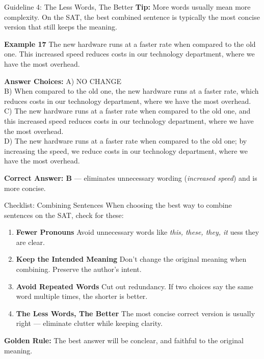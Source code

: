 \documentclass[aspectratio=169,11pt]{beamer}
\begin{document}
\begin{frame}{Guideline 4: The Less Words, The Better}
\small
\textbf{Tip:} More words usually mean more complexity. On the SAT, the best combined sentence is typically the most concise version that still keeps the meaning.

\vspace{0.5em}
\textbf{Example 17}  
The new hardware runs at a faster rate when compared to the old one. This increased speed reduces costs in our technology department, where we have the most overhead.  

\textbf{Answer Choices:}  
A) NO CHANGE \\
B) When compared to the old one, the new hardware runs at a faster rate, which reduces costs in our technology department, where we have the most overhead. \\
C) The new hardware runs at a faster rate when compared to the old one, and this increased speed reduces costs in our technology department, where we have the most overhead. \\
D) The new hardware runs at a faster rate when compared to the old one; by increasing the speed, we reduce costs in our technology department, where we have the most overhead.  

\vspace{0.5em}
\textbf{Correct Answer: B} — eliminates unnecessary wording (\emph{increased speed}) and is more concise.
\end{frame}

\begin{frame}{Checklist: Combining Sentences}
\small
When choosing the best way to combine sentences on the SAT, check for these:

\begin{enumerate}
  \item \textbf{Fewer Pronouns}  
  Avoid unnecessary words like \emph{this, these, they, it} uess they are clear.

  \item \textbf{Keep the Intended Meaning}  
  Don’t change the original meaning when combining. Preserve the author’s intent.

  \item \textbf{Avoid Repeated Words}  
  Cut out redundancy. If two choices say the same word multiple times, the shorter is better.

  \item \textbf{The Less Words, The Better}  
  The most concise correct version is usually right — eliminate clutter while keeping clarity.
\end{enumerate}

\vspace{0.6em}
\textbf{Golden Rule:} The best answer will be conclear, and faithful to the original meaning.
\end{frame}
\end{document}
